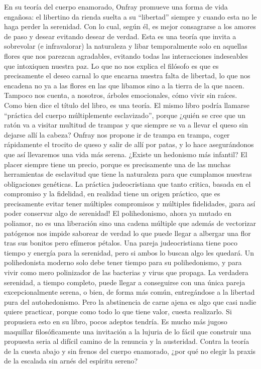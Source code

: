 \documentclass[a4paper,11pt,openright,twocolumn]{book}
\begin{document}
En su teoría del cuerpo enamorado, Onfray promueve una forma de vida engañosa: el libertino da rienda suelta a su
``libertad'' siempre y cuando esta no le haga perder la serenidad. Con lo cual, según él, es mejor consagrarse
a los amores de paso y desear evitando desear de verdad. Esta es una teoría que invita a sobrevolar (e infravalorar) la naturaleza
y libar temporalmente solo en aquellas flores que nos parezcan agradables, evitando todas las interacciones
indeseables que intoxiquen nuestra paz. Lo que no nos explica el filósofo es que es precisamente el deseo
carnal lo que encarna nuestra falta de libertad, lo que nos encadena no ya a las flores en las que libamos
sino a la tierra de la que nacen. Tampoco nos cuenta, a nosotros, árboles emocionales, cómo vivir sin raíces.
Como bien dice el título del libro, es una teoría. El mismo libro podría llamarse ``práctica del cuerpo 
múltiplemente esclavizado'', porque ¿quién se cree que un ratón va a visitar multitud de trampas y que siempre
se va a llevar el queso sin dejarse allí la cabeza? Onfray nos propone ir de trampa en trampa, coger rápidamente
el trocito de queso y salir de allí por patas, y lo hace asegurándonos que así llevaremos una vida más serena.
¿Existe un hedonismo más infantil? El placer siempre tiene un precio, porque es precisamente una de las muchas
herramientas de esclavitud que tiene la naturaleza para que cumplamos nuestras obligaciones genéticas. 
La práctica judeocristiana que tanto critica, basada en el compromiso y la fidelidad, en realidad tiene un
origen práctico, que es precisamente evitar tener múltiples compromisos y múltiples fidelidades, ¡para así
poder conservar algo de serenidad! El polihedonismo, ahora ya mutado en poliamor, no es una liberación sino una cadena
múltiple que además de vectorizar patógenos nos impide saborear de verdad lo que puede llegar a albergar
una flor tras sus bonitos pero efímeros pétalos. Una pareja judeocristiana tiene poco tiempo y energía
para la serenidad, pero si ambos lo buscan algo les quedará. Un polihedonista moderno solo debe tener tiempo para su polihedonismo,
y para vivir como mero polinizador de las bacterias y virus que propaga. La verdadera serenidad, a tiempo completo,
puede llegar a conseguirse con una única pareja excepcionalmente serena, o bien, de forma más común, entregándose
a la libertad pura del autohedonismo. Pero la abstinencia de carne ajena es algo que casi nadie quiere practicar, porque
como todo lo que tiene valor, cuesta realizarlo. Si propusiera esto en su libro, pocos adeptos tendría. Es mucho
más jugoso maquillar filosóficamente una invitación a la lujuria de lo fácil que construir una propuesta seria
al difícil camino de la renuncia y la austeridad. Contra la teoría de la cuesta abajo y sin frenos del cuerpo enamorado,
¿por qué no elegir la praxis de la escalada sin arnés del espíritu sereno? 
\end{document}
